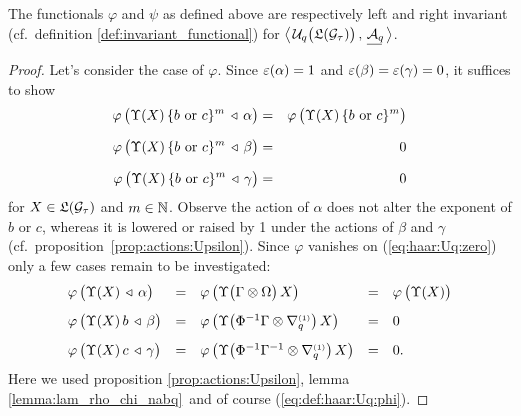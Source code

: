 \begin{prop} \label{prop:haar:Uq:invariance}
 The functionals\/ $\varphi$ and\/ $\psi$ as defined above are respectively
 left and right invariant (cf.\ definition \ref{def:invariant_functional}) for\/
 $\left\langle\vertM\right.\!  \UqTG, \, \underline{\Aq\!} \left.\vertM\right\rangle$.
\end{prop}
\begin{proof}
 Let's consider the case of $\varphi$.
 Since $\varepsilon(\alpha)=1$ and  $\varepsilon(\beta) = \varepsilon(\gamma) = 0$,
 it suffices to show
 \begin{eqnarray*}
 \varphi\left(\Upsilon(X)\, \{b \mbox{ or } c\}^m \,\ract \, \alpha
     \vertM\right)
   &=& \varphi\left(\Upsilon(X)\, \{b \mbox{ or } c\}^m  \vertM\right)
     \\ \vertXL
  \varphi\left(\Upsilon(X)\,
          \{b \mbox{ or } c\}^m \,\ract\,\beta  \vertM\right) &=& 0
    \\  \vertXL
  \varphi\left(\Upsilon(X)\,
         \{b \mbox{ or } c\}^m\, \ract \,\gamma  \vertM\right) &=& 0
\end{eqnarray*}
for $X\in \mathfrak{L}(\mathcal G_\tau)$ and $m\in \mathbb{N}$.
Observe the action of $\alpha$ does not alter the exponent of $b$ or $c$,
whereas it is lowered or raised by 1 under the actions of $\beta$ and $\gamma$
(\mbox{cf.\ proposition \ref{prop:actions:Upsilon}}). Since $\varphi$ vanishes
on (\ref{eq:haar:Uq:zero}) only a few cases remain to be investigated:
$$\begin{array}{lclcl}
   \varphi\left(\Upsilon(X)\,\ract \, \alpha  \vertM\right)
     &=& \varphi\left(\Upsilon \!\left(\Gamma \tens \Omega \vertM \right)X \vertM\right)
     &=& \varphi\left(\Upsilon(X) \vertM\right)
     \\ \vertXXL
   \varphi\left(\Upsilon(X)\,b\, \ract\,\beta  \vertM\right)
     &=& \varphi\left(\Upsilon \!\left(\Phi^{-1}\Gamma \tens \nabq{1}\right)X
      \vertM\right) &=& 0 \\  \vertXXL
   \varphi\left(\Upsilon(X) \, c\, \ract \, \gamma  \vertM\right)
     &=& \varphi\left(\Upsilon \!\left(\Phi^{-1}\Gamma^{-1} \tens \nabq{1}\right)X
       \vertM\right)
     &=& 0.
\end{array} $$
Here we used proposition \ref{prop:actions:Upsilon},
lemma \ref{lemma:lam_rho_chi_nabq}\ and of course
(\ref{eq:def:haar:Uq:phi}).
\end{proof}


